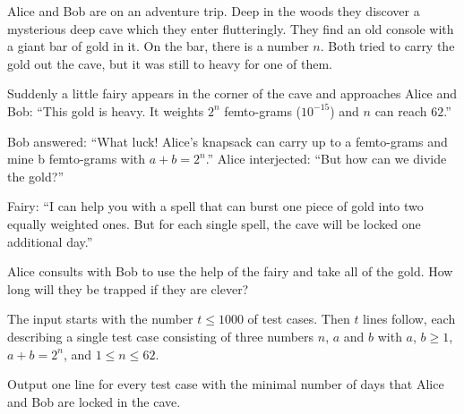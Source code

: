 Alice and Bob are on an adventure trip.
Deep in the woods they discover a mysterious deep cave which they enter flutteringly.
They find an old console with a giant bar of gold in it.
On the bar, there is a number $n$.
Both tried to carry the gold out the cave, but it was still to heavy for one of
them.

Suddenly a little fairy appears in the corner of the cave and approaches Alice and Bob:
``This gold is heavy.
It weights $2^n$ femto-grams ($10^{-15}$) and $n$ can reach $62$.''

Bob answered:
``What luck!
Alice's knapsack can carry up to a femto-grams and mine b femto-grams with $a + b = 2^n$.''
Alice interjected:
``But how can we divide the gold?''

Fairy:
``I can help you with a spell that can burst one piece of gold into two equally weighted ones.
But for each single spell, the cave will be locked one additional day.”

Alice consults with Bob to use the help of the fairy and take all of the gold. How long will they be trapped if they are clever?

\begin{Input}
    The input starts with the number $t \leq 1000$ of test cases.
    Then $t$ lines follow, each describing a single test case consisting of three numbers $n$, $a$ and $b$ with $a$, $b \geq 1$, $a + b = 2^n$, and $1 \leq n \leq 62$.
\end{Input}

\begin{Output}
    Output one line for every test case with the minimal number of days that Alice and Bob are locked in the cave.
\end{Output}
